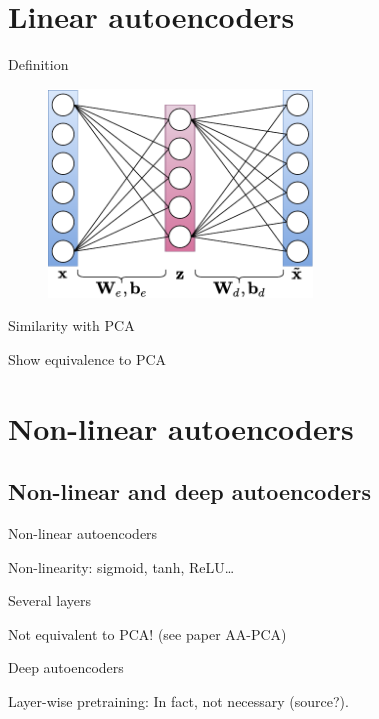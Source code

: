 \documentclass{beamer}
\begin{document}
  \section{Linear autoencoders}

  \begin{frame}{Definition}

    \begin{figure}
      \includegraphics[width=7cm]{rc/linear-autoencoder}
    \end{figure}
    
  \end{frame}

  \begin{frame}{Similarity with PCA}

    Show equivalence to PCA

    \cite{Plaut2018}
    
  \end{frame}

  \section{Non-linear autoencoders}

  \subsection{Non-linear and deep autoencoders}

  \begin{frame}{Non-linear autoencoders}

    Non-linearity: sigmoid, tanh, ReLU\dots

    Several layers

    Not equivalent to PCA! (see paper AA-PCA)

  \end{frame}

  \begin{frame}{Deep autoencoders}

    Layer-wise pretraining: \cite{Hinton2006}
    In fact, not necessary (source?).
    
  \end{frame}
\end{document}
